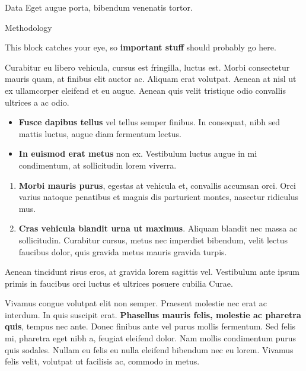 \documentclass[final]{beamer}
\newlength{\colwidth}
\begin{document}
\begin{frame}[t]
\begin{columns}[t]
\begin{column}{\colwidth}
\begin{block}{Data}{}
				Eget augue porta, bibendum venenatis tortor.
				
			\end{block}
			
			\begin{block}{Methodology}
				
				This block catches your eye, so \textbf{important stuff} should probably go
				here.
				
				Curabitur eu libero vehicula, cursus est fringilla, luctus est. Morbi
				consectetur mauris quam, at finibus elit auctor ac. Aliquam erat volutpat.
				Aenean at nisl ut ex ullamcorper eleifend et eu augue. Aenean quis velit
				tristique odio convallis ultrices a ac odio.
				
				\begin{itemize}
					\item \textbf{Fusce dapibus tellus} vel tellus semper finibus. In
					consequat, nibh sed mattis luctus, augue diam fermentum lectus.
					\item \textbf{In euismod erat metus} non ex. Vestibulum luctus augue in
					mi condimentum, at sollicitudin lorem viverra.
				\end{itemize}
			
				\begin{enumerate}
					\item \textbf{Morbi mauris purus}, egestas at vehicula et, convallis
					accumsan orci. Orci varius natoque penatibus et magnis dis parturient
					montes, nascetur ridiculus mus.
					\item \textbf{Cras vehicula blandit urna ut maximus}. Aliquam blandit nec
					massa ac sollicitudin. Curabitur cursus, metus nec imperdiet bibendum,
					velit lectus faucibus dolor, quis gravida metus mauris gravida turpis.
				\end{enumerate}
				
				Aenean tincidunt risus eros, at gravida lorem sagittis vel. Vestibulum ante
				ipsum primis in faucibus orci luctus et ultrices posuere cubilia Curae.
				
				Vivamus congue volutpat elit non semper. Praesent molestie nec erat ac
				interdum. In quis suscipit erat. \textbf{Phasellus mauris felis, molestie
					ac pharetra quis}, tempus nec ante. Donec finibus ante vel purus mollis
				fermentum. Sed felis mi, pharetra eget nibh a, feugiat eleifend dolor. Nam
				mollis condimentum purus quis sodales. Nullam eu felis eu nulla eleifend
				bibendum nec eu lorem. Vivamus felis velit, volutpat ut facilisis ac,
				commodo in metus.
				

\end{block}
\end{column}
\end{columns}
\end{frame}
\end{document}
